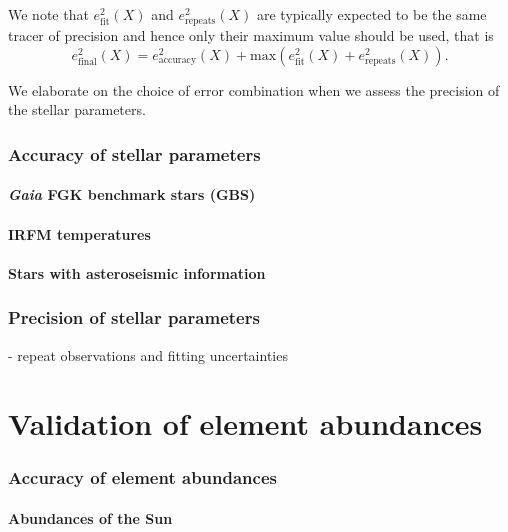 \documentclass[fleqn,usenatbib,useAMS]{mnras}
\newcommand{\Gaia}{\textit{Gaia}\xspace}
\begin{document}
We note that $e_\text{fit}^2(X)$ and $e_\text{repeats}^2(X)$ are typically expected to be the same tracer of precision and hence only their maximum value should be used, that is
\begin{equation}
e_\text{final}^2 (X) = e_\text{accuracy}^2(X) + \text{max} \left(e_\text{fit}^2(X) + e_\text{repeats}^2(X) \right).
\end{equation}

We elaborate on the choice of error combination when we assess the precision of the stellar parameters.

\subsubsection{Accuracy of stellar parameters}

\paragraph*{\Gaia FGK benchmark stars (GBS)}

\paragraph*{IRFM temperatures}

\paragraph*{Stars with asteroseismic information}

\subsubsection{Precision of stellar parameters}

- repeat observations and fitting uncertainties

\section{Validation of element abundances} \label{sec:validation_ab}

\subsubsection{Accuracy of element abundances}

\paragraph*{Abundances of the Sun}
\end{document}
